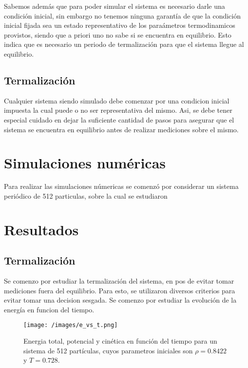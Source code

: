 \documentclass[%
 reprint,
 amsmath,amssymb,
 aps,
]{revtex4-1}
\begin{document}
Sabemos adem\'as que para poder simular el sistema es necesario darle una
condici\'on inicial, sin embargo no tenemos ninguna garant\'ia de que la
condici\'on inicial fijada sea un estado representativo de los para\'ametros
termodinamicos provistos, siendo que a priori uno no sabe si se encuentra en
equilibrio. Esto indica que es necesario un periodo de termalizaci\'on para que
el sistema llegue al equilibrio.

\subsection{Termalizaci\'on}

Cualquier sistema siendo simulado debe comenzar por una condicion inicial
impuesta la cual puede o no ser representativa del mismo. Asi, se debe tener
especial cuidado en dejar la suficiente cantidad de pasos para asegurar que el
sistema se encuentra en equilibrio antes de realizar mediciones sobre el mismo.


\section{Simulaciones num\'ericas}

Para realizar las simulaciones n\'umericas se comenz\'o por considerar un
sistema peri\'odico de 512 particulas, sobre la cual se estudiaron

\section{Resultados}

\subsection{Termalizaci\'on}

Se comenzo por estudiar la termalizaci\'on del sistema, en pos de evitar tomar
mediciones fuera del equilibrio. Para esto, se utilizaron diversos criterios
para evitar tomar una decision sesgada. Se comenzo por estudiar la evoluci\'on
de la energ\'ia en funcion del tiempo.

\begin{figure}
  \begin{center}
  \texttt{[image: /images/e\_vs\_t.png]}
  \caption{Energia total, potencial y cin\'etica en funci\'on del tiempo para
  un sistema de 512 part\'iculas, cuyos parametros iniciales son
  $\rho = 0.8422$ y $T = 0.728$.}
  \label{e_vs_t}
\end{center}
\end{figure}
\end{document}
